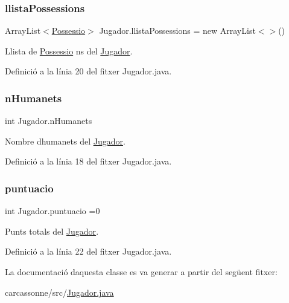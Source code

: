 \subsubsection{\texorpdfstring{llista\+Possessions}{llistaPossessions}}
{\footnotesize\ttfamily Array\+List$<$\mbox{\hyperlink{class_possessio}{Possessio}}$>$ Jugador.\+llista\+Possessions = new Array\+List$<$$>$()\hspace{0.3cm}{\ttfamily [private]}}



Llista de \mbox{\hyperlink{class_possessio}{Possessio}} ns del \mbox{\hyperlink{class_jugador}{Jugador}}. 



Definició a la línia 20 del fitxer Jugador.\+java.

\mbox{\label{class_jugador_a4ea2472182548451fce5be41eec23a46}} 
\subsubsection{\texorpdfstring{n\+Humanets}{nHumanets}}
{\footnotesize\ttfamily int Jugador.\+n\+Humanets\hspace{0.3cm}{\ttfamily [private]}}



Nombre d\textquotesingle{}humanets del \mbox{\hyperlink{class_jugador}{Jugador}}. 



Definició a la línia 18 del fitxer Jugador.\+java.

\mbox{\label{class_jugador_a08c2ed45358b666b8c41f93f86fc30ad}} 
\subsubsection{\texorpdfstring{puntuacio}{puntuacio}}
{\footnotesize\ttfamily int Jugador.\+puntuacio =0\hspace{0.3cm}{\ttfamily [private]}}



Punts totals del \mbox{\hyperlink{class_jugador}{Jugador}}. 



Definició a la línia 22 del fitxer Jugador.\+java.



La documentació d\textquotesingle{}aquesta classe es va generar a partir del següent fitxer\+:\begin{DoxyCompactItemize}
\item 
carcassonne/src/\mbox{\hyperlink{_jugador_8java}{Jugador.\+java}}\end{DoxyCompactItemize}
